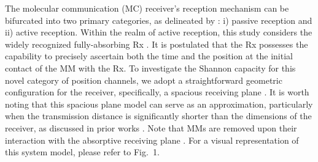 \documentclass[conference]{IEEEtran}
\theoremstyle{definition}
\theoremstyle{plain}
\begin{document}

\color{black}
The molecular communication (MC) receiver's reception mechanism can be bifurcated into two primary categories, as delineated by \cite{jamali2019channel}: i) passive reception and ii) active reception. Within the realm of active reception, this study considers the widely recognized fully-absorbing Rx \cite{yilmaz2014three}. It is postulated that the Rx possesses the capability to precisely ascertain both the time \cite{srinivas2012molecular} and the position \cite{lee2016distribution,pandey2018molecular,akdeniz2018molecular} at the initial contact of the MM with the Rx. To investigate the Shannon capacity \cite{shannon1948mathematical} for this novel category of position channels, we adopt a straightforward geometric configuration for the receiver, specifically, a spacious receiving plane \cite{andrews2009accurate}. It is worth noting that this spacious plane model can serve as an approximation, particularly when the transmission distance is significantly shorter than the dimensions of the receiver, as discussed in prior works \cite{lee2016distribution,lee2023char}. Note that MMs are removed upon their interaction with the absorptive receiving plane \cite{yilmaz2014three,pandey2018molecular}. For a visual representation of this system model, please refer to Fig.~1.
\color{black}
\end{document}
